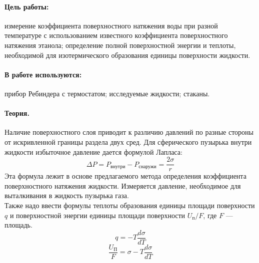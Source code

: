 \documentclass{letnab}
\begin{document}


\paragraph{Цель работы:} измерение коэффициента поверхностного натяжения воды при разной температуре с использованием известного коэффициента поверхностного натяжения этанола; определение полной поверхностной энергии и теплоты, необходимой для изотермического образования единицы поверхности жидкости.
\paragraph{В работе используются:} прибор Ребиндера с термостатом; исследуемые жидкости; стаканы.
\paragraph{Теория.} Наличие поверхностного слоя приводит к различию давлений по разные стороны от искривленной границы раздела двух сред. Для сферического пузырька внутри жидкости избыточное давление дается формулой Лапласа: 
\begin{equation}
\Delta P = P_\text{внутри} - P_\text{снаружи} = \dfrac{2\sigma}{r}
\end{equation}
Эта формула лежит в основе предлагаемого метода определения коэффициента поверхностного натяжения жидкости. Измеряется давление, необходимое для выталкивания в жидкость пузырька газа.\\
Также надо ввести формулы теплоты образования единицы площади поверхности $q$ и поверхностной энергии единицы площади поверхности     $U_\text{п}/F$, где $F$ --- площадь.
\begin{equation}
q = -T\dfrac{d\sigma}{dT}
\end{equation}
\begin{equation}
\dfrac{U_\text{П}}{F} = \sigma - T\dfrac{d\sigma}{dT}
\end{equation}
 
\end{document}
